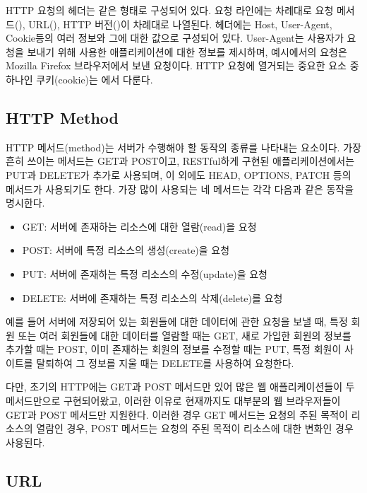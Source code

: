 HTTP 요청의 헤더는 \과 같은 형태로 구성되어 있다. 요청 라인에는 차례대로 요청 메서드(), URL(), HTTP 버전()이 차례대로 나열된다. 헤더에는 Host, User-Agent, Cookie등의 여러 정보와 그에 대한 값으로 구성되어 있다. User-Agent는 사용자가 요청을 보내기 위해 사용한 애플리케이션에 대한 정보를 제시하며, 예시에서의 요청은 Mozilla Firefox 브라우저에서 보낸 요청이다. HTTP 요청에 열거되는 중요한 요소 중 하나인 쿠키(cookie)는 에서 다룬다.

\subsection*{HTTP Method}

HTTP 메서드(method)는 서버가 수행해야 할 동작의 종류를 나타내는 요소이다. 가장 흔히 쓰이는 메서드는 GET과 POST이고, RESTful하게 구현된 애플리케이션에서는 PUT과 DELETE가 추가로 사용되며, 이 외에도 HEAD, OPTIONS, PATCH 등의 메서드가 사용되기도 한다. 가장 많이 사용되는 네 메서드는 각각 다음과 같은 동작을 명시한다.

\begin{itemize}
    \item GET: 서버에 존재하는 리소스에 대한 열람(read)을 요청
    \item POST: 서버에 특정 리소스의 생성(create)을 요청
    \item PUT: 서버에 존재하는 특정 리소스의 수정(update)을 요청
    \item DELETE: 서버에 존재하는 특정 리소스의 삭제(delete)를 요청
\end{itemize}

예를 들어 서버에 저장되어 있는 회원들에 대한 데이터에 관한 요청을 보낼 때, 특정 회원 또는 여러 회원들에 대한 데이터를 열람할 때는 GET, 새로 가입한 회원의 정보를 추가할 때는 POST, 이미 존재하는 회원의 정보를 수정할 때는 PUT, 특정 회원이 사이트를 탈퇴하여 그 정보를 지울 때는 DELETE를 사용하여 요청한다.

다만, 초기의 HTTP에는 GET과 POST 메서드만 있어 많은 웹 애플리케이션들이 두 메서드만으로 구현되어왔고, 이러한 이유로 현재까지도 대부분의 웹 브라우저들이 GET과 POST 메서드만 지원한다. 이러한 경우 GET 메서드는 요청의 주된 목적이 리소스의 열람인 경우, POST 메서드는 요청의 주된 목적이 리소스에 대한 변화인 경우 사용된다.

\subsection*{URL}

